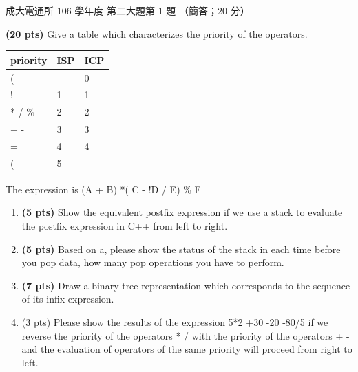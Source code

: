 \begin{pastexam}[label={px:ncku-106-cce-ds-05}]{成大電通所 106 學年度 第二大題第 1 題}
（簡答；20 分）

\textbf{(20 pts)} Give a table which characterizes the priority of the operators.

\begin{center}
\begin{tabular}{|p{3.5cm}|p{2.2cm}|p{2.2cm}|}
\hline
priority & ISP & ICP \\ \hline
( & & 0 \\ \hline
! & 1 & 1 \\ \hline
* \quad / \quad \% & 2 & 2 \\ \hline
+ \quad - & 3 & 3 \\ \hline
= & 4 & 4 \\ \hline
( & 5 & \\ \hline
\end{tabular}
\end{center}

The expression is \quad (A + B) *( C - !D / E) \% F
\begin{enumerate}[label=\alph*.]
\item \textbf{(5 pts)} Show the equivalent postfix expression if we use a stack to evaluate the
postfix expression in C++ from left to right.
\item \textbf{(5 pts)} Based on a, please show the status of the stack in each time before you pop
data, how many pop operations you have to perform.
\item \textbf{(7 pts)} Draw a binary tree representation which corresponds to the sequence of its
infix expression.
\item (3 pts) Please show the results of the expression 5*2 +30 -20 -80/5 if we reverse the
priority of the operators * / with the priority of the operators + - and the evaluation of
operators of the same priority will proceed from right to left.
\end{enumerate}
\end{pastexam}

